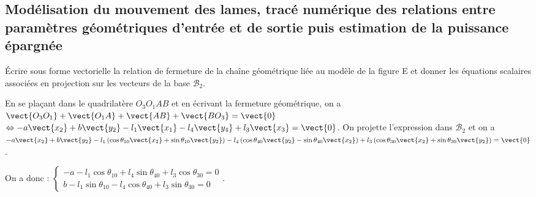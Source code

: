 \documentclass[11pt]{article}
\begin{document}
\subsection{Modélisation du mouvement des lames, tracé numérique des relations entre paramètres
géométriques d’entrée et de sortie puis estimation de la puissance épargnée}



\UPSTIquestion  Écrire sous forme vectorielle la relation de fermeture de la chaîne géométrique liée au modèle de la
figure E et donner les équations scalaires associées en projection sur les vecteurs de la base $\mathcal{B}_2$.

\begin{UPSTIcorrige}
En se plaçant dans le quadrilatère $O_3O_1AB$ et en écrivant la fermeture géométrique, on a 
$\vect{O_3 O_1} + \vect{O_1 A} + \vect{AB} + \vect{BO_3}  = \vect{0}$
$\Leftrightarrow -a \vect{x_2} + b\vect{y_2} -l_1 \vect{x_1} -l_4 \vect{y_4} + l_3 \vect{x_3} = \vect{0}$. On projette l'expression dans $\mathcal{B}_2$ et  on a
$-a \vect{x_2} + b\vect{y_2} -l_1 \left(\cos\theta_{10} \vect{x_2} + \sin\theta_{10} \vect{y_2}  \right)-l_4 \left( 
\cos \theta_{40} \vect{y_2} - \sin\theta_{40} \vect{x_2} \right) + l_3 \left(\cos\theta_{30} \vect{x_2} + \sin\theta_{30} \vect{y_2}  \right)= \vect{0}$.

On a donc  :
$
\left\{ 
\begin{array}{l}
-a  -l_1 \cos\theta_{10} + l_4   \sin\theta_{40}   + l_3 \cos\theta_{30} = 0 \\
 b -l_1  \sin\theta_{10} -l_4  \cos \theta_{40}  + l_3  \sin\theta_{30}   =0
\end{array}
\right.
$.


%
%
%
%
%


\end{UPSTIcorrige}
\end{document}
